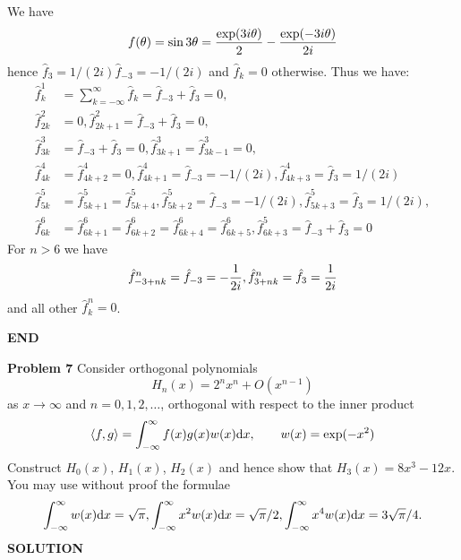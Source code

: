 \documentclass[12pt,a4paper]{article}
\begin{document}
We have
\[
f(\ensuremath{\theta}) = \sin 3 \ensuremath{\theta} = { \exp(3 i \ensuremath{\theta}) \over 2} -  { \exp(-3 i \ensuremath{\theta}) \over 2 i}
\]
hence $\hat f_3 = 1/(2i) \hat f_{-3} = -1/(2i)$ and $\hat f_k = 0$ otherwise. Thus we have:
\begin{align*}
\hat f_k^1 &= \sum_{k=-\ensuremath{\infty}}^\ensuremath{\infty} \hat f_k = \hat f_{-3} + \hat f_3 = 0, \\
\hat f_{2k}^2 &= 0, \hat f_{2k+1}^2 = \hat f_{-3} + \hat f_3 = 0, \\
\hat f_{3k}^3 &= \hat f_{-3} + \hat f_3 = 0, \hat f_{3k+1}^3 = \hat f_{3k-1}^3 = 0, \\
\hat f_{4k}^4 &= \hat f_{4k+2}^4 = 0, \hat f_{4k+1}^4 = \hat f_{-3} = -1/(2i), \hat f_{4k+3}^4 = \hat f_{3} = 1/(2i) \\
\hat f_{5k}^5 &= \hat f_{5k+1}^5 = \hat f_{5k+4}^5,  \hat f_{5k+2}^5 = \hat f_{-3} = -1/(2i),  \hat f_{5k+3}^5 = \hat f_{3} = 1/(2i), \\
\hat f_{6k}^6 &= \hat f_{6k+1}^6 = \hat f_{6k+2}^6 = \hat f_{6k+4}^6 = \hat f_{6k+5}^6,  \hat f_{6k+3}^5 = \hat f_{-3} + \hat f_{3} = 0
\end{align*}
For $n > 6$ we have
\[
\hat f_{-3+nk}^n =  \hat f_{-3} = -{1 \over 2i},\hat f_{3+nk}^n =  \hat f_{3} = {1 \over 2i}
\]
and all other $\hat f_k^n = 0$.

\textbf{END}

\textbf{Problem 7} Consider orthogonal polynomials
\[
H_n(x) = 2^n x^n + O (x^{n-1})
\]
as $x \ensuremath{\rightarrow} \ensuremath{\infty}$ and $n = 0, 1, 2, \ensuremath{\ldots}$,  orthogonal with respect to the inner product
\[
\langle f, g \rangle = \int_{-\ensuremath{\infty}}^\ensuremath{\infty} f(x) g(x) w(x) {\rm d}x, \qquad w(x) = \exp(-x^2)
\]
Construct $H_0(x)$, $H_1(x)$, $H_2(x)$ and hence show that $H_3(x) = 8x^3-12x$. You may use without proof the formulae
\[
\int_{-\ensuremath{\infty}}^\ensuremath{\infty} w(x) {\rm d}x = \sqrt{\ensuremath{\pi}}, \int_{-\ensuremath{\infty}}^\ensuremath{\infty} x^2 w(x) {\rm d}x = \sqrt{\ensuremath{\pi}}/2,
\int_{-\ensuremath{\infty}}^\ensuremath{\infty} x^4 w(x) {\rm d}x = 3\sqrt{\ensuremath{\pi}}/4.
\]
\textbf{SOLUTION}
\end{document}
